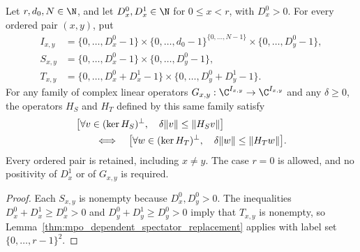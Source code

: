 \begin{lemma}
    \label{thm:mpo_joint_boundary_spectator_gap}
    \leanok
    Let $r,d_0,N\in\N$, and let $D_x^0,D_x^1\in\N$ for $0\leq x<r$,
    with $D_x^0>0$.  For every ordered pair $(x,y)$, put
    \begin{align}
        I_{x,y} & =\{0,\ldots,D_x^0-1\}\times\{0,\ldots,d_0-1\}^{\{0,\ldots,N-1\}}
        \times\{0,\ldots,D_y^0-1\},                                                \\
        S_{x,y} & =\{0,\ldots,D_x^0-1\}\times\{0,\ldots,D_y^0-1\},                 \\
        T_{x,y} & =\{0,\ldots,D_x^0+D_x^1-1\}\times\{0,\ldots,D_y^0+D_y^1-1\}.
    \end{align}
    For any family of complex linear operators $G_{x,y}:\C^{I_{x,y}}\to\C^{I_{x,y}}$
    and any $\delta\geq0$, the operators $H_S$ and $H_T$ defined by this same
    family satisfy
    \begin{align}
         & \bigl[\forall v\in(\ker H_S)^\perp,\quad
        \delta\|v\|\leq\|H_Sv\|\bigr]\notag         \\
         & \qquad\Longleftrightarrow\quad
        \bigl[\forall w\in(\ker H_T)^\perp,\quad
            \delta\|w\|\leq\|H_Tw\|\bigr].
    \end{align}
    Every ordered pair is retained, including $x\ne y$.  The case $r=0$ is
    allowed, and no positivity of $D_x^1$ or of $G_{x,y}$ is required.
\end{lemma}
\begin{proof}
    \leanok
    Each $S_{x,y}$ is nonempty because $D_x^0,D_y^0>0$.
    The inequalities $D_x^0+D_x^1\geq D_x^0>0$ and
    $D_y^0+D_y^1\geq D_y^0>0$ imply that $T_{x,y}$ is nonempty, so
    Lemma~\ref{thm:mpo_dependent_spectator_replacement} applies with
    label set $\{0,\ldots,r-1\}^2$.
\end{proof}

